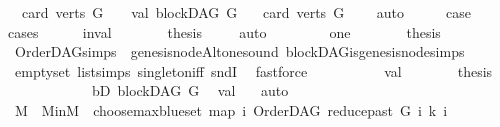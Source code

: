 \begin{isabellebody}
\ \ card\ {\isacharparenleft}{\kern0pt}verts\ G{\isacharparenright}{\kern0pt}\ {\isacharequal}{\kern0pt}\ {}{\isachardoublequoteclose}\ {\isacharbar}{\kern0pt}\ {\isacharparenleft}{\kern0pt}val{\isacharparenright}{\kern0pt}\ {\isachardoublequoteopen}blockDAG\ G\ {\isasymand}\isanewline
\ \ card\ {\isacharparenleft}{\kern0pt}verts\ G{\isacharparenright}{\kern0pt}\ {\isasymnoteq}\ {}{\isachardoublequoteclose}\ \isamarkupfalse%
\ auto\isanewline
\ \ \isamarkupfalse%
\ \isamarkupfalse%
\ {\isacharquery}{\kern0pt}case\ \isanewline
\ \ \isamarkupfalse%
{\isacharparenleft}{\kern0pt}cases{\isacharparenright}{\kern0pt}\isanewline
\ \ \ \ \isamarkupfalse%
\ inval\isanewline
\ \ \ \ \isamarkupfalse%
\ \isamarkupfalse%
\ {\isacharquery}{\kern0pt}thesis\ \isamarkupfalse%
\ {}\ \isamarkupfalse%
\ auto\isanewline
\ \ \isamarkupfalse%
\isanewline
\ \ \ \ \isamarkupfalse%
\ one\isanewline
\ \ \ \ \isamarkupfalse%
\ \isamarkupfalse%
\ {\isacharquery}{\kern0pt}thesis\ \isamarkupfalse%
\ OrderDAG{\isachardot}{\kern0pt}simps\ {}\ genesis{\isacharunderscore}{\kern0pt}nodeAlt{\isacharunderscore}{\kern0pt}one{\isacharunderscore}{\kern0pt}sound\ blockDAG{\isachardot}{\kern0pt}is{\isacharunderscore}{\kern0pt}genesis{\isacharunderscore}{\kern0pt}node{\isachardot}{\kern0pt}simps\isanewline
\ \ \ \ \ \ \isamarkupfalse%
\ empty{\isacharunderscore}{\kern0pt}set\ list{\isachardot}{\kern0pt}simps{\isacharparenleft}{\kern0pt}{}{}{\isacharparenright}{\kern0pt}\ singleton{\isacharunderscore}{\kern0pt}iff\ sndI\ \isamarkupfalse%
\ fastforce\ \ \isanewline
\ \ \isamarkupfalse%
\isanewline
\ \ \ \ \isamarkupfalse%
\ val\isanewline
\ \ \ \ \isamarkupfalse%
\ \isamarkupfalse%
\ {\isacharquery}{\kern0pt}thesis\isanewline
\ \ \ \ \isamarkupfalse%
\ \isanewline
\ \ \ \ \isamarkupfalse%
\ bD{\isacharcolon}{\kern0pt}\ {\isachardoublequoteopen}blockDAG\ G{\isachardoublequoteclose}\ \isamarkupfalse%
\ val\ \ \isamarkupfalse%
\ auto\isanewline
\ \ \ \ \isamarkupfalse%
\ M\ \ M{\isacharunderscore}{\kern0pt}in{\isacharcolon}{\kern0pt}{\isachardoublequoteopen}M\ {\isacharequal}{\kern0pt}\ choose{\isacharunderscore}{\kern0pt}max{\isacharunderscore}{\kern0pt}blue{\isacharunderscore}{\kern0pt}set\ {\isacharparenleft}{\kern0pt}map\ {\isacharparenleft}{\kern0pt}{\isasymlambda}i{\isachardot}{\kern0pt}\ {\isacharparenleft}{\kern0pt}OrderDAG\ {\isacharparenleft}{\kern0pt}reduce{\isacharunderscore}{\kern0pt}past\ G\ i{\isacharparenright}{\kern0pt}\ k{\isacharcomma}{\kern0pt}\ i{\isacharparenright}{\kern0pt}{\isacharparenright}{\kern0pt}\isanewline

\end{isabellebody}
